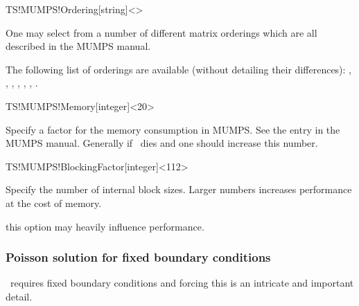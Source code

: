 \begin{fdfentry}{TS!MUMPS!Ordering}[string]<>

  One may select from a number of different matrix orderings which are
  all described in the MUMPS manual. 

  The following list of orderings are available (without detailing
  their differences): %
  , , , , ,
  , .
  
\end{fdfentry}

\begin{fdfentry}{TS!MUMPS!Memory}[integer]<20>

  Specify a factor for the memory consumption in MUMPS. See the
   entry in the MUMPS manual. Generally if \tsiesta\
  dies and  one should increase this number.
  
\end{fdfentry}

\begin{fdfentry}{TS!MUMPS!BlockingFactor}[integer]<112>

  Specify the number of internal block sizes. Larger numbers increases
  performance at the cost of memory.
  
  \note this option may heavily influence performance.

\end{fdfentry}

\subsubsection{Poisson solution for fixed boundary conditions}

\tsiesta\ requires fixed boundary conditions and forcing this is an
intricate and important detail. 

